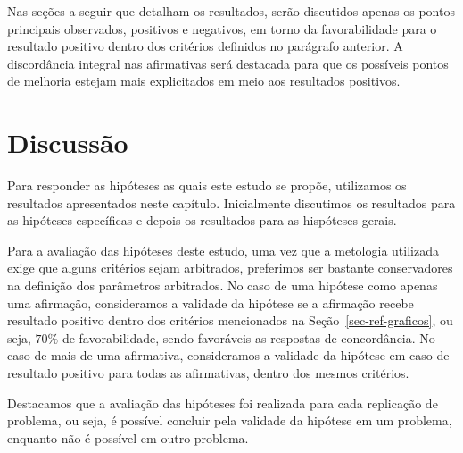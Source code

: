 Nas seções a seguir que detalham os resultados, serão discutidos apenas os
pontos principais observados, positivos e negativos, em torno da
favorabilidade para o resultado positivo dentro dos critérios
definidos no parágrafo anterior.
A discordância integral nas afirmativas será destacada para que
os possíveis pontos de melhoria estejam mais explicitados em meio
aos resultados positivos.




\section{Discussão}
\label{sec-avaliacao-hipoteses}
Para responder as hipóteses as quais este estudo se propõe, utilizamos
os resultados apresentados neste capítulo.
Inicialmente discutimos os resultados para as hipóteses
específicas e depois os resultados para as hispóteses gerais.

Para a avaliação das hipóteses deste estudo, uma vez que a
metologia utilizada exige que alguns critérios sejam
arbitrados, preferimos ser bastante conservadores
na definição dos parâmetros arbitrados.
No caso de uma hipótese como apenas uma afirmação, consideramos
a validade da hipótese se a afirmação recebe
resultado positivo dentro dos critérios mencionados na
Seção~\ref{sec-ref-graficos}, ou seja, $70\%$ de favorabilidade,
sendo favoráveis as respostas de concordância.
No caso de mais de uma afirmativa, consideramos a validade
da hipótese em caso de resultado positivo para todas
as afirmativas, dentro dos mesmos critérios.

Destacamos que a avaliação das hipóteses foi realizada para
cada replicação de problema, ou seja, é possível concluir pela
validade da hipótese em um problema, enquanto não é possível
em outro problema.


\AprovacaoHipoteseResultado{}{}{}{}{}{}{}{}{}


